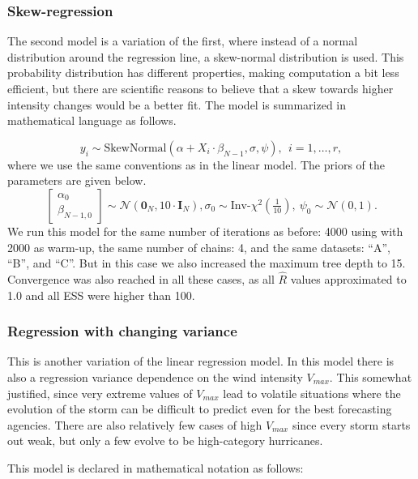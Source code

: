 \documentclass[
]{article}
\begin{document}
\hypertarget{skew-regression}{%
\subsubsection{Skew-regression}\label{skew-regression}}

The second model is a variation of the first, where instead of a normal
distribution around the regression line, a skew-normal distribution is
used. This probability distribution has different properties, making
computation a bit less efficient, but there are scientific reasons to
believe that a skew towards higher intensity changes would be a better
fit. The model is summarized in mathematical language as follows.

\[ y_{i} \sim \textrm{SkewNormal}(\alpha + X_i \cdot\beta_{N-1}, \sigma, \psi), \ \ i=1,\dots,r, \]
where we use the same conventions as in the linear model. The priors of
the parameters are given below.
\[\begin{bmatrix} \alpha_0 \\ \beta_{N-1,0} \end{bmatrix} \sim \mathcal{N}(\mathbf{0}_N, 10 \cdot \mathbf{I}_N), \sigma_0 \sim \textrm{Inv-}\chi^2(\tfrac{1}{10}) , \ \psi_0 \sim \mathcal{N}(0,1) .\]
We run this model for the same number of iterations as before: 4000
using with 2000 as warm-up, the same number of chains: 4, and the same
datasets: ``A'', ``B'', and ``C''. But in this case we also increased
the maximum tree depth to 15. Convergence was also reached in all these
cases, as all \(\hat{R}\) values approximated to 1.0 and all ESS were
higher than 100.

\hypertarget{regression-with-changing-variance}{%
\subsubsection{Regression with changing
variance}\label{regression-with-changing-variance}}

This is another variation of the linear regression model. In this model
there is also a regression variance dependence on the wind intensity
\(V_{max}.\) This somewhat justified, since very extreme values of
\(V_{max}\) lead to volatile situations where the evolution of the storm
can be difficult to predict even for the best forecasting agencies.
There are also relatively few cases of high \(V_{max}\) since every
storm starts out weak, but only a few evolve to be high-category
hurricanes.

This model is declared in mathematical notation as follows:
\end{document}
